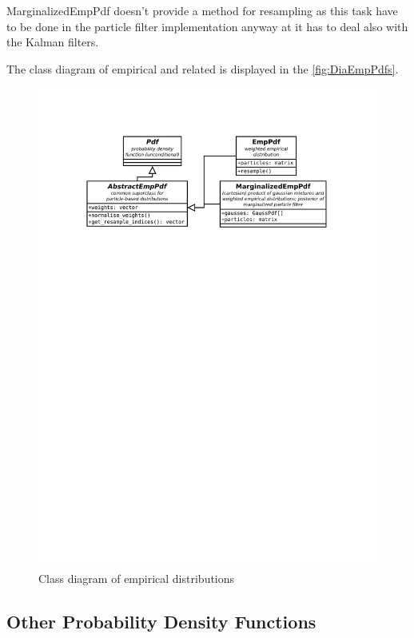 MarginalizedEmpPdf doesn't provide a method for resampling as this task have to be done in the
particle filter implementation anyway at it has to deal also with the Kalman filters.

The class diagram of empirical {\pdfs} and related is displayed in the \autoref{fig:DiaEmpPdfs}.

\begin{figure}[ht]
	\centering
	\includegraphics[width=\textwidth,keepaspectratio=true,clip=true,trim=3cm 210mm 3cm 3cm]{./diagrams/emp_pdfs.pdf}
	\vspace{-8mm}
	\caption{Class diagram of empirical distributions}
	\label{fig:DiaEmpPdfs}
\end{figure}

\subsection{Other Probability Density Functions}

